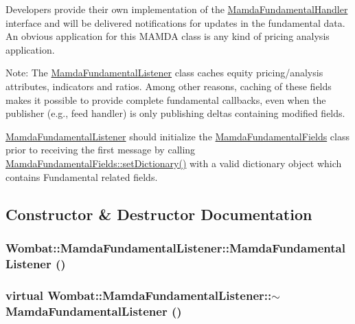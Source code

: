 Developers provide their own implementation of the \hyperlink{classWombat_1_1MamdaFundamentalHandler}{Mamda\-Fundamental\-Handler} interface and will be delivered notifications for updates in the fundamental data. An obvious application for this MAMDA class is any kind of pricing analysis application.

Note: The \hyperlink{classWombat_1_1MamdaFundamentalListener}{Mamda\-Fundamental\-Listener} class caches equity pricing/analysis attributes, indicators and ratios. Among other reasons, caching of these fields makes it possible to provide complete fundamental callbacks, even when the publisher (e.g., feed handler) is only publishing deltas containing modified fields.

\hyperlink{classWombat_1_1MamdaFundamentalListener}{Mamda\-Fundamental\-Listener} should initialize the \hyperlink{classWombat_1_1MamdaFundamentalFields}{Mamda\-Fundamental\-Fields} class prior to receiving the first message by calling \hyperlink{classWombat_1_1MamdaFundamentalFields_3d638ca8f449c896788024326b50efb9}{Mamda\-Fundamental\-Fields::set\-Dictionary()} with a valid dictionary object which contains Fundamental related fields. 



\subsection{Constructor \& Destructor Documentation}
\hypertarget{classWombat_1_1MamdaFundamentalListener_472613466103dc23a863c407f95256c6}{
\subsubsection[MamdaFundamentalListener]{\setlength{\rightskip}{0pt plus 5cm}Wombat::Mamda\-Fundamental\-Listener::Mamda\-Fundamental\-Listener ()}}
\label{classWombat_1_1MamdaFundamentalListener_472613466103dc23a863c407f95256c6}


\hypertarget{classWombat_1_1MamdaFundamentalListener_a0255445090ed91d283ddb6d637abd42}{
\subsubsection[$\sim$MamdaFundamentalListener]{\setlength{\rightskip}{0pt plus 5cm}virtual Wombat::Mamda\-Fundamental\-Listener::$\sim$Mamda\-Fundamental\-Listener ()}}
\label{classWombat_1_1MamdaFundamentalListener_a0255445090ed91d283ddb6d637abd42}




